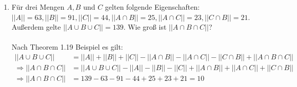 \begin{enumerate}[label=(\alph*)]
        \item Für drei Mengen $A, B$ und $C$ gelten folgende Eigenschaften: 
        $||A|| = 63, ||B|| = 91, ||C|| = 44, ||A\cap B|| = 25, ||A\cap C|| = 23, ||C \cap B|| = 21$. 
        Außerdem gelte $||A\cup B\cup C|| = 139$. Wie groß ist $||A \cap B \cap C||$?\\\\
        Nach Theorem 1.19 Beispiel es gilt:
        \begin{align*}
	        ||A\cup B\cup C|| &= ||A||+||B||+||C||-||A\cap B||-||A\cap C||-||C \cap B||+||A \cap B \cap C||\\
	        \Rightarrow ||A \cap B \cap C|| &= ||A\cup B\cup C||-||A||-||B||-||C||+||A\cap B||+||A\cap C||+||C \cap B||\\
	        \Rightarrow ||A \cap B \cap C|| &= 139 - 63 - 91 - 44 + 25 + 23 + 21 = 10 \\
        \end{align*}
    \end{enumerate}
